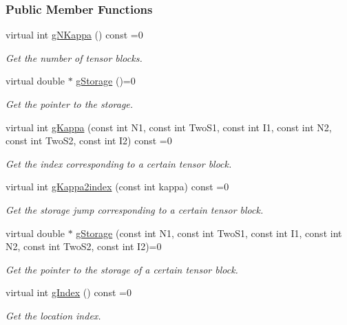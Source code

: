 \subsubsection*{Public Member Functions}
\begin{DoxyCompactItemize}
\item 
virtual int \hyperlink{classCheMPS2_1_1Tensor_ad68f65759e764c6cb55e2b8db18f8874}{g\-N\-Kappa} () const =0
\begin{DoxyCompactList}\small\item\em Get the number of tensor blocks. \end{DoxyCompactList}\item 
virtual double $\ast$ \hyperlink{classCheMPS2_1_1Tensor_a2f17a5413447e77ad3f128d49b3ca676}{g\-Storage} ()=0
\begin{DoxyCompactList}\small\item\em Get the pointer to the storage. \end{DoxyCompactList}\item 
virtual int \hyperlink{classCheMPS2_1_1Tensor_a3d8493380e00a9548267a79dae7e5567}{g\-Kappa} (const int N1, const int Two\-S1, const int I1, const int N2, const int Two\-S2, const int I2) const =0
\begin{DoxyCompactList}\small\item\em Get the index corresponding to a certain tensor block. \end{DoxyCompactList}\item 
virtual int \hyperlink{classCheMPS2_1_1Tensor_adc93c318803791bef7286dfea3b135c0}{g\-Kappa2index} (const int kappa) const =0
\begin{DoxyCompactList}\small\item\em Get the storage jump corresponding to a certain tensor block. \end{DoxyCompactList}\item 
virtual double $\ast$ \hyperlink{classCheMPS2_1_1Tensor_a4335fc5fb5892a7386820c72b769f157}{g\-Storage} (const int N1, const int Two\-S1, const int I1, const int N2, const int Two\-S2, const int I2)=0
\begin{DoxyCompactList}\small\item\em Get the pointer to the storage of a certain tensor block. \end{DoxyCompactList}\item 
virtual int \hyperlink{classCheMPS2_1_1Tensor_a5af7779b53e54e506a1d569a723fdd11}{g\-Index} () const =0
\begin{DoxyCompactList}\small\item\em Get the location index. \end{DoxyCompactList}\end{DoxyCompactItemize}
